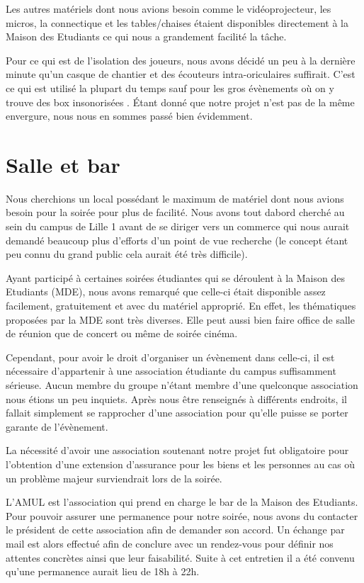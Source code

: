 Les autres matériels dont nous avions besoin comme le vidéoprojecteur,
les micros, la connectique et les tables/chaises étaient disponibles directement à
la Maison des Etudiants ce qui nous a grandement facilité la tâche.

Pour ce qui est de l'isolation des joueurs, nous avons décidé un peu à
la dernière minute qu'un casque de chantier et des écouteurs
intra-oriculaires suffirait. C'est ce qui est utilisé la plupart du
temps sauf pour les gros évènements où on y trouve des \og box
insonorisées \fg{}. Étant donné que notre projet n'est pas de la même
envergure, nous nous en sommes passé bien évidemment.

\section{Salle et bar}%
\label{sec:salle_et_bar}

Nous cherchions un local possédant le maximum de matériel dont nous
avions besoin pour la soirée pour plus de facilité. Nous avons tout
dabord cherché au sein du campus de Lille 1 avant de se diriger vers
un commerce qui nous aurait demandé beaucoup plus d'efforts d'un point de
vue recherche (le concept étant peu connu du grand public cela aurait été
très difficile).

Ayant participé à certaines soirées étudiantes qui se déroulent à la
Maison des Etudiants (MDE), nous avons remarqué que celle-ci était
disponible assez facilement, gratuitement et avec du matériel approprié.
En effet, les thématiques proposées par la MDE sont très diverses. Elle
peut aussi bien faire office de salle de réunion que de concert ou même
de soirée cinéma.

Cependant, pour avoir le droit d'organiser un évènement dans celle-ci, il est nécessaire
d'appartenir à une association étudiante du campus suffisamment sérieuse. Aucun
membre du groupe n'étant membre d'une quelconque association nous étions un
peu inquiets. Après nous être renseignés à différents endroits, il fallait
simplement se rapprocher d'une association pour qu'elle puisse se porter
garante de l'évènement.

La nécessité d'avoir une association soutenant notre projet fut obligatoire pour
l'obtention d'une extension d'assurance pour les biens et les personnes
au cas où un problème majeur surviendrait lors de la soirée.

L'AMUL est l'association qui prend en charge le bar de la Maison des
Etudiants. Pour pouvoir assurer une permanence pour notre soirée, nous
avons du contacter le président de cette association afin de demander
son accord. Un échange par mail est alors effectué afin de conclure avec
un rendez-vous pour définir nos attentes concrètes ainsi que leur faisabilité.
Suite à cet entretien il a été convenu qu'une permanence
aurait lieu de 18h à 22h.


